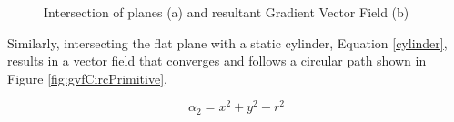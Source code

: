 \documentclass[numbered,pdftex]{ohio-etd}
\begin{document}
\begin{figure}[H]
	\begin{subfigmatrix}{2}%
		\centering	
		\hspace*{0mm}
	\end{subfigmatrix}
	\caption{Intersection of planes (a) and resultant Gradient Vector Field (b)}
	\label{fig:gvfLinePrimitive}
\end{figure}

Similarly, intersecting the flat plane with a static cylinder, Equation \ref{cylinder}, results in a vector field that converges and follows a circular path shown in Figure \ref{fig:gvfCircPrimitive}.

\begin{equation}
\label{cylinder}
\alpha_2 = x^2+y^2-r^2
\end{equation}
\end{document}
